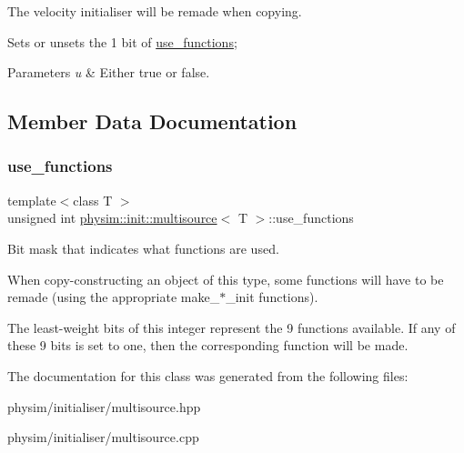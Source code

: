 The velocity initialiser will be remade when copying. 

Sets or unsets the 1 bit of \hyperlink{classphysim_1_1init_1_1multisource_a12caae3f36b17cd343065aab62b62a8c}{use\+\_\+functions}; 
\begin{DoxyParams}{Parameters}
{\em u} & Either true or false. \\
\hline
\end{DoxyParams}


\subsection{Member Data Documentation}
\mbox{\label{classphysim_1_1init_1_1multisource_a12caae3f36b17cd343065aab62b62a8c}} 
\subsubsection{\texorpdfstring{use\+\_\+functions}{use\_functions}}
{\footnotesize\ttfamily template$<$class T $>$ \\
unsigned int \hyperlink{classphysim_1_1init_1_1multisource}{physim\+::init\+::multisource}$<$ T $>$\+::use\+\_\+functions\hspace{0.3cm}{\ttfamily [private]}}



Bit mask that indicates what functions are used. 

When copy-\/constructing an object of this type, some functions will have to be remade (using the appropriate make\+\_\+$\ast$\+\_\+init functions).

The least-\/weight bits of this integer represent the 9 functions available. If any of these 9 bits is set to one, then the corresponding function will be made. 

The documentation for this class was generated from the following files\+:\begin{DoxyCompactItemize}
\item 
physim/initialiser/multisource.\+hpp\item 
physim/initialiser/multisource.\+cpp\end{DoxyCompactItemize}
